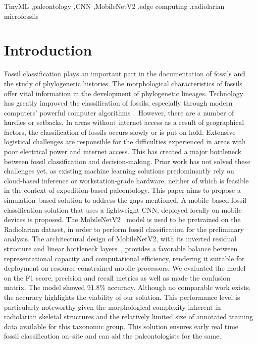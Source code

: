 \documentclass[a4paper,fleqn]{cas-sc}
\begin{document}
\begin{keywords}
TinyML \sep paleontology \sep CNN \sep MobileNetV2 \sep edge computing \sep radiolarian microfossils
\end{keywords}

\maketitle

\section{Introduction}

Fossil classification plays an important part in the documentation of fossils and the study of phylogenetic histories. The morphological characteristics of fossils offer vital information in the development of phylogenetic lineages. Technology has greatly improved the classification of fossils, especially through modern computers' powerful computer algorithms~\cite{hsiang2019machine,sun2023deep}. However, there are a number of hurdles or setbacks. In areas without internet access as a result of geographical factors, the classification of fossils occurs slowly or is put on hold. Extensive logistical challenges are responsible for the difficulties experienced in areas with poor electrical power and internet access. This has created a major bottleneck between fossil classification and decision-making. Prior work has not solved these challenges yet, as existing machine learning solutions predominantly rely on cloud-based inference or workstation-grade hardware, neither of which is feasible in the context of expedition-based paleontology. This paper aims to propose a simulation--based solution to address the gaps mentioned. A mobile--based fossil classification solution that uses a lightweight CNN, deployed locally on mobile devices is proposed. The MobileNetV2~\cite{sandler2018mobilenetv2} model is used to be pretrained on the Radiolarian dataset, in order to perform fossil classification for the preliminary analysis. The architectural design of MobileNetV2, with its inverted residual structure and linear bottleneck layers~\cite{sandler2018mobilenetv2}, provides a favorable balance between representational capacity and computational efficiency, rendering it suitable for deployment on resource-constrained mobile processors. We evaluated the model on the F1 score, precision and recall metrics as well as made the confusion matrix. The model showed 91.8\% accuracy. Although no comparable work exists, the accuracy highlights the viability of our solution. This performance level is particularly noteworthy given the morphological complexity inherent in radiolarian skeletal structures and the relatively limited size of annotated training data available for this taxonomic group. This solution ensures early real time fossil classification on--site and can aid the paleontologists for the same.
\end{document}
